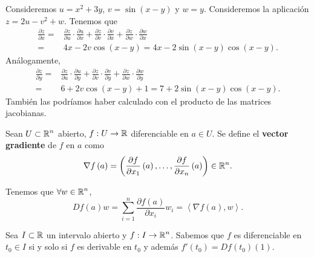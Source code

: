 \begin{eg}
Consideremos $\displaystyle u = x^{2}+3y $, $\displaystyle v = \sin\left(x-y\right) $ y $\displaystyle w = y $. Consideremos la aplicación $\displaystyle z = 2u-v^{2}+w $. Tenemos que 
\[
\begin{split}
	\frac{\partial z}{\partial x} = & \frac{\partial z}{\partial u} \cdot \frac{\partial u}{ \partial x} + \frac{\partial z}{\partial v} \cdot \frac{\partial v}{\partial x} + \frac{\partial z}{\partial w} \cdot \frac{\partial w}{\partial x} \\
	= &  4x -2v\cos\left(x-y\right) = 4x -2\sin\left(x-y\right)\cos\left(x-y\right).
\end{split}
\]
Análogamente, 
\[
\begin{split}
	\frac{\partial z}{\partial y} = & \frac{\partial z}{\partial u} \cdot \frac{\partial u}{ \partial y} + \frac{\partial z}{\partial v} \cdot \frac{\partial v}{\partial y} + \frac{\partial z}{\partial w} \cdot \frac{\partial w}{\partial y} \\
	= &  6 +2v\cos\left(x-y\right) + 1 = 7 + 2\sin\left(x-y\right)\cos\left(x-y\right).
\end{split}
\]
También las podríamos haber calculado con el producto de las matrices jacobianas. 
\end{eg}
\begin{definition}
Sean $\displaystyle U \subset \mathbb{R}^{n} $ abierto, $\displaystyle f : U \to \mathbb{R} $ diferenciable en $\displaystyle a \in U $. Se define el \textbf{vector gradiente} de $\displaystyle f $ en $\displaystyle a $ como 
\[\nabla f\left(a\right)= \left(\frac{\partial f}{\partial x_{1}}\left(a\right), \ldots, \frac{\partial f}{\partial x_{n}}\left(a\right)\right) \in \mathbb{R}^{n} .\]
\end{definition}
\begin{observation}
Tenemos que $\displaystyle \forall w \in \mathbb{R}^{n} $,
\[Df\left(a\right)w = \sum^{n}_{i = 1}\frac{\partial f\left(a\right)}{\partial x_{i}}w_{i} = \left\langle \nabla f\left(a\right), w \right\rangle  .\]
\end{observation}
\begin{observation}
Sea $\displaystyle I \subset \mathbb{R} $ un intervalo abierto y $\displaystyle f : I \to \mathbb{R}^{n} $. Sabemos que $\displaystyle f $ es diferenciable en $\displaystyle t_{0} \in I $ si y solo si $\displaystyle f $ es derivable en $\displaystyle t_{0} $ y además $\displaystyle f'\left(t_{0}\right) = Df\left(t_{0}\right)\left(1\right) $. 
\end{observation}
